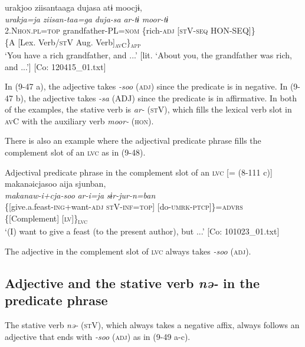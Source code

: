 \ex \label{ex:9.47b} %
    \gllll  urakjoo  ziisantaaga  dujasa  atɨ   moocjɨ,\\
      \textit{urakja=ja}  \textit{ziisan-taa=ga}  \textit{duja-sa}  \textit{ar-tɨ}  \textit{moor-tɨ}\\
      2.N\textsc{hon}.\textsc{pl}=\textsc{top}  grandfather-PL=\textsc{nom}  \{rich-\textsc{adj}  [\textsc{st}V-\textsc{seq}  HON-SEQ]\}\\
          \{A  [Lex. Verb/\textsc{st}V   Aug. Verb]\textsubscript{\textsc{av}C}\}\textsubscript{\textsc{app}}\\
      \glt       ‘You have a rich grandfather, and ...’ [lit. ‘About you, the grandfather was rich, and ...’] [Co: 120415\_01.txt]
    \z
\z

In (9-47 a), the adjective takes \textit{{}-soo} (\textsc{adj}) since the predicate is in negative. In (9-47 b), the adjective takes \textit{{}-sa} (ADJ) since the predicate is in affirmative. In both of the examples, the stative verb is \textit{ar-} (\textsc{st}V), which fills the lexical verb slot in \textsc{av}C with the auxiliary verb \textit{moor-} (\textsc{hon}).

There is also an example where the adjectival predicate phrase fills the complement slot of an \textsc{lvc} as in (9-48).

\ea   Adjectival predicate phrase in the complement slot of an \textsc{lvc} [= (8-111 c)] \label{ex:9.48}
 \gllll  makanəicjasoo  aija  sjunban,\\
    \textit{makanaw-i+cja-soo}  \textit{ar-i=ja}  \textit{sɨr-jur-n=ban}\\
    \{[give.a.feast-\textsc{ing}+want-\textsc{adj}  \textsc{st}V-\textsc{inf}=\textsc{top}]  [do-\textsc{umrk}-\textsc{ptcp}]\}=\textsc{advrs}\\
    \{[Complement]    [\textsc{lv}]\}\textsubscript{\textsc{lvc}}\\
    \glt     ‘(I) want to give a feast (to the present author), but ...’ [Co: 101023\_01.txt]
\z

The adjective in the complement slot of \textsc{lvc} always takes \textit{{}-soo} (\textsc{adj}).

\subsection{Adjective and the stative verb \textit{nə-} in the predicate phrase}\label{sec:9.2.3}

The stative verb \textit{nə-} (\textsc{st}V), which always takes a negative affix, always follows an adjective that ends with \textit{{}-soo} (\textsc{adj}) as in (9-49 a-c).

